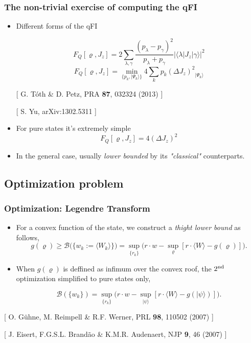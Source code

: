 \documentclass{beamer}
\newcommand{\ket}[1]{\ensuremath{\vert #1 \rangle}}
\newcommand{\braOket}[3]{\ensuremath{\langle #1 \vert #2 \vert #3 \rangle}}
\newcommand{\expect}[1]{\ensuremath{\langle #1 \rangle}}
\newcommand{\varian}[1]{\ensuremath{\left(\Delta #1 \right)^2}}
\newcommand{\citate}[1]{{\footnotesize{\color{gray}[ #1 ]}}

	}
\begin{document}
	\begin{frame}
		\frametitle{The non-trivial exercise of computing the qFI}

		\begin{itemize}
			\item<1-> Different forms of the qFI
				\begin{block}
					{}
					\small
					\[
						F_Q[\varrho,J_z]=2 \sum_{\lambda,\gamma} \frac{(p_\lambda-p_\gamma)^2}{p_\lambda+p_\gamma} |\braOket{\lambda}{J_z}{\gamma}|^2
					\]
					\[
					  F_Q[\varrho,J_z]=\min_{\{p_k,\ket{\Psi_k}\}} 4\sum_k p_k \varian{J_z}_{\ket{\Psi_k}}
					\]
				\end{block}

				\citate{G. T\'oth \& D. Petz, PRA {\bf 87}, 032324 (2013)}
				\citate{S. Yu, arXiv:1302.5311}

			\item<2-> For pure states it's extremely simple
				{\small
				\[
					F_Q[\varrho,J_z] = 4\varian{J_z}
				\]
				}
			\item<3-> In the general case, usually \emph{\color{blue} lower bounded} by its \emph{"classical"} counterparts.

		\end{itemize}

	\end{frame}

	\subsection{Optimization problem}

		\begin{frame}
			\frametitle{Optimization: Legendre Transform}
			\begin{itemize}
				\item For a convex function of the state, we construct a \emph{thight lower bound} as follows,
					{\small \[
					g(\varrho) \geq
					\mathcal{B} \big( \{w_k := \expect{W_k}\} \big) = \sup_{\{r_k\}} \big( r \cdot w - \sup_{\varrho} [ r\cdot\expect{W} - g(\varrho) ] \big).
					\]}
				\item When $g(\varrho)$ is deffined as infimum over the convex roof, the $2^{\rm nd}$ optimization simplified to pure states only,
					\begin{block}
						{}
						{\small
						\vspace{8px}
						\[
						\mathcal{B}(\{w_k\}) = \sup_{\{r_k\}} \big( r\cdot w - \sup_{\ket{\psi}} [ r\cdot\expect{W} - g(\ket{\psi}) ] \big).
						\]}
					\end{block}
			\end{itemize}

			\citate{O. G\"uhne, M. Reimpell \& R.F. Werner, PRL {\bf 98}, 110502 (2007)}
			\citate{J. Eisert, F.G.S.L. Brand\~ao \& K.M.R. Audenaert, NJP {\bf 9}, 46 (2007)}
		\end{frame}
\end{document}
